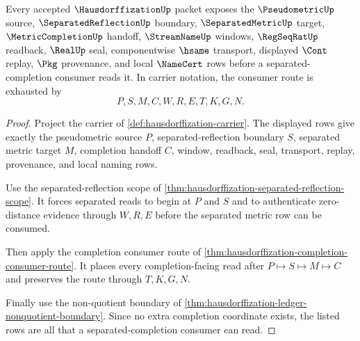 \begin{theorem}
\label{thm:hausdorffization-separated-completion-obligation}
Every accepted $\HausdorffizationUp$ packet exposes the $\PseudometricUp$ source, $\SeparatedReflectionUp$ boundary, $\SeparatedMetricUp$ target, $\MetricCompletionUp$ handoff, $\StreamNameUp$ windows, $\RegSeqRatUp$ readback, $\RealUp$ seal, componentwise $\hsame$ transport, displayed $\Cont$ replay, $\Pkg$ provenance, and local $\NameCert$ rows before a separated-completion consumer reads it. In carrier notation, the consumer route is exhausted by
$$
P,S,M,C,W,R,E,T,K,G,N .
$$
\end{theorem}
\begin{proof}
Project the carrier of \autoref{def:hausdorffization-carrier}. The displayed rows give exactly the pseudometric source $P$, separated-reflection boundary $S$, separated metric target $M$, completion handoff $C$, window, readback, seal, transport, replay, provenance, and local naming rows.

Use the separated-reflection scope of \autoref{thm:hausdorffization-separated-reflection-scope}. It forces separated reads to begin at $P$ and $S$ and to authenticate zero-distance evidence through $W,R,E$ before the separated metric row can be consumed.

Then apply the completion consumer route of \autoref{thm:hausdorffization-completion-consumer-route}. It places every completion-facing read after $P \longmapsto S \longmapsto M \longmapsto C$ and preserves the route through $T,K,G,N$.

Finally use the non-quotient boundary of \autoref{thm:hausdorffization-ledger-nonquotient-boundary}. Since no extra completion coordinate exists, the listed rows are all that a separated-completion consumer can read.
\end{proof}

